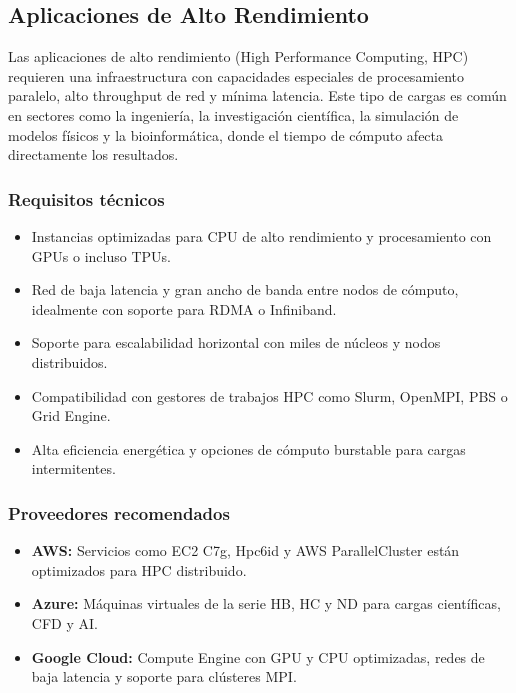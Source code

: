 {        \subsection{Aplicaciones de Alto Rendimiento}
            Las aplicaciones de alto rendimiento (High Performance Computing, HPC) requieren una infraestructura con capacidades especiales de procesamiento paralelo, alto throughput de red y mínima latencia. Este tipo de cargas es común en sectores como la ingeniería, la investigación científica, la simulación de modelos físicos y la bioinformática, donde el tiempo de cómputo afecta directamente los resultados.
            
            \subsubsection{Requisitos técnicos}
                \begin{itemize}
                    \item Instancias optimizadas para CPU de alto rendimiento y procesamiento con GPUs o incluso TPUs.
                    \item Red de baja latencia y gran ancho de banda entre nodos de cómputo, idealmente con soporte para RDMA o Infiniband.
                    \item Soporte para escalabilidad horizontal con miles de núcleos y nodos distribuidos.
                    \item Compatibilidad con gestores de trabajos HPC como Slurm, OpenMPI, PBS o Grid Engine.
                    \item Alta eficiencia energética y opciones de cómputo burstable para cargas intermitentes.
                \end{itemize}

            \subsubsection{Proveedores recomendados}
                \begin{itemize}
                    \item \textbf{AWS:} Servicios como EC2 C7g, Hpc6id y AWS ParallelCluster están optimizados para HPC distribuido.
                    \item \textbf{Azure:} Máquinas virtuales de la serie HB, HC y ND para cargas científicas, CFD y AI.
                    \item \textbf{Google Cloud:} Compute Engine con GPU y CPU optimizadas, redes de baja latencia y soporte para clústeres MPI.
                \end{itemize}
                
}
